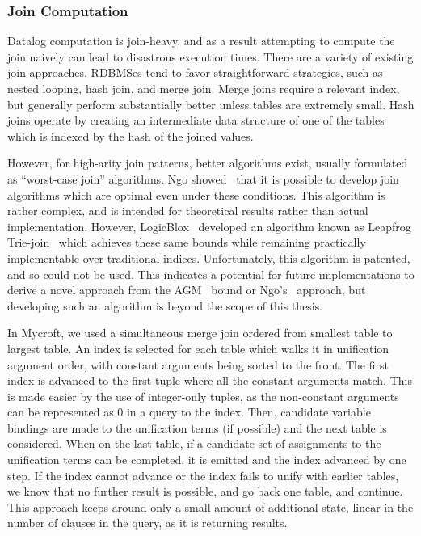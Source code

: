 \subsubsection{Join Computation}
\label{holmes:sec:join}
Datalog computation is join-heavy, and as a result attempting to compute the join naively can lead to disastrous execution times.
There are a variety of existing join approaches.
RDBMSes tend to favor straightforward strategies, such as nested looping, hash join, and merge join.
Merge joins require a relevant index, but generally perform substantially better unless tables are extremely small.
Hash joins operate by creating an intermediate data structure of one of the tables which is indexed by the hash of the joined values.

However, for high-arity join patterns, better algorithms exist, usually formulated as ``worst-case join'' algorithms.
Ngo showed~\cite{nprr} that it is possible to develop join algorithms which are optimal even under these conditions.
This algorithm is rather complex, and is intended for theoretical results rather than actual implementation.
However, LogicBlox~\cite{logicblox} developed an algorithm known as Leapfrog Trie-join~\cite{lftj} which achieves these same bounds while remaining practically implementable over traditional indices.
Unfortunately, this algorithm is patented, and so could not be used.
This indicates a potential for future implementations to derive a novel approach from the AGM~\cite{agm} bound or Ngo's~\cite{nprr} approach, but developing such an algorithm is beyond the scope of this thesis.

In Mycroft, we used a simultaneous merge join ordered from smallest table to largest table.
An index is selected for each table which walks it in unification argument order, with constant arguments being sorted to the front.
The first index is advanced to the first tuple where all the constant arguments match.
This is made easier by the use of integer-only tuples, as the non-constant arguments can be represented as 0 in a query to the index.
Then, candidate variable bindings are made to the unification terms (if possible) and the next table is considered.
When on the last table, if a candidate set of assignments to the unification terms can be completed, it is emitted and the index advanced by one step.
If the index cannot advance or the index fails to unify with earlier tables, we know that no further result is possible, and go back one table, and continue.
This approach keeps around only a small amount of additional state, linear in the number of clauses in the query, as it is returning results.

